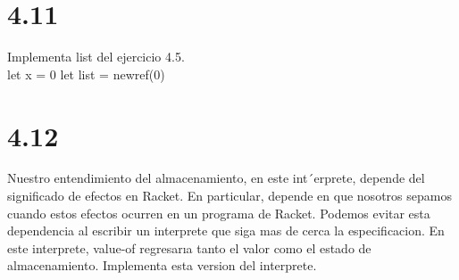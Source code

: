 \documentclass{article}
\begin{document}
\begin{tab}
\section{4.11}
Implementa list del ejercicio 4.5.\\

let x = 0
let list = newref(0)


\section{4.12}
Nuestro entendimiento del almacenamiento, en este int´erprete, depende del significado de efectos en Racket. En particular, depende en que nosotros sepamos cuando estos efectos ocurren en un programa de Racket. Podemos evitar esta dependencia al escribir un interprete que siga mas de cerca la especificacion. En este interprete, value-of regresarıa tanto el valor como el estado de almacenamiento.
Implementa esta version del interprete.

\end{tab}
\end{document}
